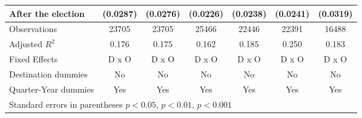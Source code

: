 \begin{table}[htbp]
\begin{tabular}{l*{6}{c}}
After the election                    &    (0.0287)         &    (0.0276)         &    (0.0226)         &    (0.0238)         &    (0.0241)         &    (0.0319)         \\
\hline
Observations        &       23705         &       23705         &       25466         &       22446         &       22391         &       16488         \\
Adjusted \(R^{2}\)  &       0.176         &       0.175         &       0.162         &       0.185         &       0.250         &       0.183         \\
Fixed Effects       &       D x O         &       D x O         &       D x O         &       D x O         &       D x O         &       D x O         \\
Destination dummies &          No         &          No         &          No         &          No         &          No         &          No         \\
Quarter-Year dummies&         Yes         &         Yes         &         Yes         &         Yes         &         Yes         &         Yes         \\
\hline\hline
\multicolumn{7}{l}{ Standard errors in parentheses \sym{*} \(p<0.05\), \sym{**} \(p<0.01\), \sym{***} \(p<0.001\)}\\
\end{tabular}
\end{table}
